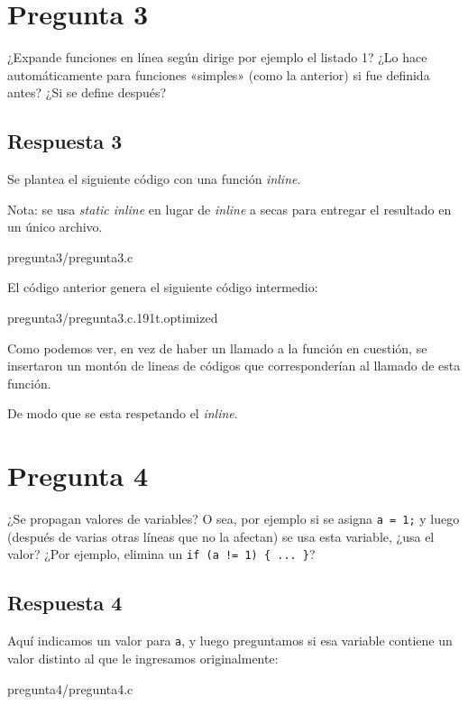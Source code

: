 \documentclass[spanish, fleqn]{article}
\begin{document}
\section{Pregunta 3}

¿Expande funciones en línea según dirige por ejemplo el listado 1? ¿Lo hace automáticamente para funciones «simples» (como la anterior) si fue definida antes? ¿Si se define después?

\subsection{Respuesta 3}

Se plantea el siguiente código con una función \textit{inline}.

Nota: se usa \textit{static inline} en lugar de \textit{inline} a secas para entregar el resultado en un único archivo.

 {pregunta3/pregunta3.c}

El código anterior genera el siguiente código intermedio:

 {pregunta3/pregunta3.c.191t.optimized}
    
Como podemos ver, en vez de haber un llamado a la función en cuestión, se insertaron un montón de lineas de códigos que corresponderían al llamado de esta función. 

De modo que se esta respetando el \textit{inline}.

\section{Pregunta 4}

¿Se propagan valores de variables? O sea, por ejemplo si se asigna \texttt{a = 1;} y luego (después de varias otras líneas que no la afectan) se usa esta variable, ¿usa el valor? ¿Por ejemplo, elimina un \texttt{if (a != 1) \{ ... \}}?

\subsection{Respuesta 4}

Aquí indicamos un valor para \texttt{a}, y luego preguntamos si esa variable contiene un valor distinto al que le ingresamos originalmente:

 {pregunta4/pregunta4.c}
\end{document}
